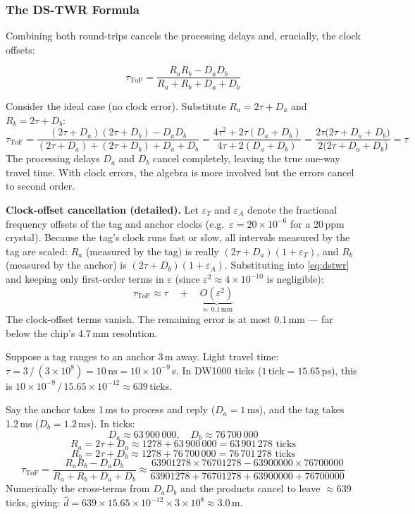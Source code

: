 \documentclass[11pt,a4paper]{article}
\begin{document}
\subsubsection{The DS-TWR Formula}

Combining both round-trips cancels the processing delays and, crucially, the clock offsets:

\begin{equation}
\boxed{
\tau_\text{ToF} = \frac{R_a R_b - D_a D_b}{R_a + R_b + D_a + D_b}
}
\label{eq:dstwr}
\end{equation}

\begin{intubox}
Consider the ideal case (no clock error). Substitute $R_a = 2\tau + D_a$ and $R_b = 2\tau + D_b$:
\[
\tau_\text{ToF} = \frac{(2\tau+D_a)(2\tau+D_b) - D_a D_b}{(2\tau+D_a) + (2\tau+D_b) + D_a + D_b}
= \frac{4\tau^2 + 2\tau(D_a+D_b)}{4\tau + 2(D_a+D_b)}
= \frac{2\tau\bigl(2\tau + D_a + D_b\bigr)}{2\bigl(2\tau + D_a + D_b\bigr)} = \tau
\]
The processing delays $D_a$ and $D_b$ cancel completely, leaving the true one-way travel time. With clock errors, the algebra is more involved but the errors cancel to second order.
\end{intubox}

\textbf{Clock-offset cancellation (detailed).}
Let $\varepsilon_T$ and $\varepsilon_A$ denote the fractional frequency offsets of the tag and anchor clocks (e.g.\ $\varepsilon = 20 \times 10^{-6}$ for a 20\,ppm crystal). Because the tag's clock runs fast or slow, all intervals measured by the tag are scaled: $R_a$ (measured by the tag) is really $(2\tau + D_a)(1 + \varepsilon_T)$, and $R_b$ (measured by the anchor) is $(2\tau + D_b)(1 + \varepsilon_A)$. Substituting into \cref{eq:dstwr} and keeping only first-order terms in $\varepsilon$ (since $\varepsilon^2 \approx 4\times10^{-10}$ is negligible):
\[
\tau_\text{ToF} \approx \tau \quad + \quad \underbrace{O(\varepsilon^2)}_{\approx\,0.1\,\text{mm}}
\]
The clock-offset terms vanish. The remaining error is at most $0.1$\,mm --- far below the chip's 4.7\,mm resolution.

\begin{exbox}
Suppose a tag ranges to an anchor 3\,m away. Light travel time: $\tau = 3\,/\,(3\times10^8) = 10\,\text{ns} = 10\times10^{-9}$\,s. In DW1000 ticks ($1\,\text{tick} = 15.65\,\text{ps}$), this is $10\times10^{-9}\,/\,15.65\times10^{-12} \approx 639$\,ticks.

Say the anchor takes 1\,ms to process and reply ($D_a = 1\,\text{ms}$), and the tag takes 1.2\,ms ($D_b = 1.2\,\text{ms}$). In ticks:
\[
D_a \approx 63\,900\,000, \quad D_b \approx 76\,700\,000
\]
\[
R_a = 2\tau + D_a \approx 1278 + 63\,900\,000 = 63\,901\,278 \text{ ticks}
\]
\[
R_b = 2\tau + D_b \approx 1278 + 76\,700\,000 = 76\,701\,278 \text{ ticks}
\]
\[
\tau_\text{ToF} = \frac{R_a R_b - D_a D_b}{R_a + R_b + D_a + D_b}
\approx \frac{63901278 \times 76701278 - 63900000 \times 76700000}{63901278 + 76701278 + 63900000 + 76700000}
\]
Numerically the cross-terms from $D_a D_b$ and the products cancel to leave $\approx 639$\,ticks, giving:
$\hat{d} = 639 \times 15.65\times10^{-12} \times 3\times10^8 \approx 3.0$\,m. \checkmark
\end{exbox}
\end{document}
